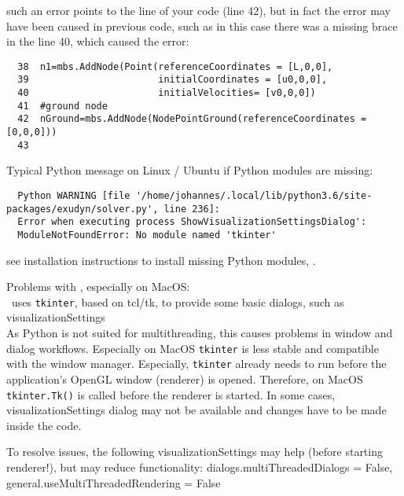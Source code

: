 \onlyRST{\rstStartNewLine}
%
\item[$\ra$] such an error points to the line of your code (line 42), but in fact the error may have been caused in previous code, such as in this case there was a missing brace in the line 40, which caused the error:
\pythonstyle\begin{lstlisting}
  38  n1=mbs.AddNode(Point(referenceCoordinates = [L,0,0],
  39                       initialCoordinates = [u0,0,0],
  40                       initialVelocities= [v0,0,0])
  41  #ground node
  42  nGround=mbs.AddNode(NodePointGround(referenceCoordinates = [0,0,0]))
  43  
\end{lstlisting}
%
%
\item Typical Python  message on Linux / Ubuntu if Python modules are missing:
\plainlststyle
\begin{lstlisting}
  Python WARNING [file '/home/johannes/.local/lib/python3.6/site-packages/exudyn/solver.py', line 236]: 
  Error when executing process ShowVisualizationSettingsDialog':
  ModuleNotFoundError: No module named 'tkinter'
\end{lstlisting}
\onlyRST{\rstStartNewLine}
%
\item[$\ra$] see installation instructions to install missing Python modules, .

\item Problems with , especially on MacOS:\\
  \codeName\ uses \texttt{tkinter}, based on tcl/tk, to provide some basic dialogs, such as visualizationSettings\\
  As Python is not suited for multithreading, this causes problems in window and dialog workflows. Especially on MacOS
  \texttt{tkinter} is less stable and compatible with the window manager. Especially, \texttt{tkinter} already needs to run
  before the application's OpenGL window (renderer) is opened. Therefore, on MacOS \texttt{tkinter.Tk()} is called before the 
  renderer is started.
  In some cases, visualizationSettings dialog may not be available and changes have to be made inside the code.
  
\item[$\ra$] To resolve issues, the following visualizationSettings may help (before starting renderer!), but may reduce functionality: 
     dialogs.multiThreadedDialogs = False, general.useMultiThreadedRendering = False
\ei 




